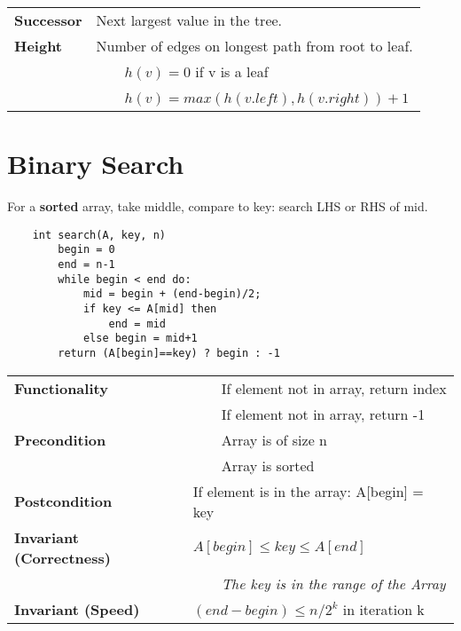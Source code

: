 \documentclass{article}
\newcommand{\tabitem}{~~\llap{\textbullet}~~}
\begin{document}
    \begin{tabular}{ll}
        \textbf{Successor} & Next largest value in the tree.\\
        \textbf{Height} & Number of edges on longest path from root to leaf.\\
        & \tabitem $h(v) = 0$ if v is a leaf\\
        & \tabitem $h(v) = max(h(v.left), h(v.right)) + 1$\\
    \end{tabular}

    



    \pagebreak

    \section{Binary Search}
    For a \textbf{sorted }array, take middle, compare to key: search LHS or RHS of mid.

    \begin{verbatim}
    int search(A, key, n)
        begin = 0
        end = n-1
        while begin < end do:
            mid = begin + (end-begin)/2;
            if key <= A[mid] then
                end = mid
            else begin = mid+1
        return (A[begin]==key) ? begin : -1    
    \end{verbatim}


    \begin{tabular}{ll}
        \toprule
        \textbf{Functionality} & \tabitem If element not in array, return index\\
        & \tabitem If element not in array, return -1\\
        \midrule
        \textbf{Precondition} & \tabitem Array is of size n\\
        & \tabitem Array is sorted\\
        \midrule
        \textbf{Postcondition} & If element is in the array: A[begin] = key\\
        \midrule
        \textbf{Invariant (Correctness)} & $A[begin] \leq key \leq A[end]$ \\
        & \tabitem \emph{The key is in the range of the Array}\\
        \midrule
        \textbf{Invariant (Speed)} & $(end-begin) \leq n/2^{k}$ in iteration k \\
        \bottomrule
    \end{tabular}
\end{document}
